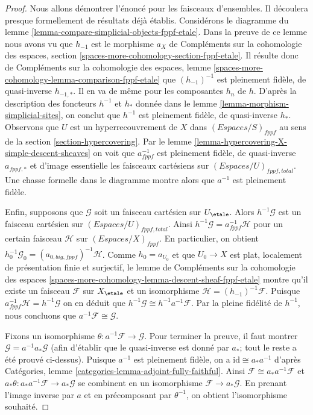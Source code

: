 \begin{proof}
Nous allons démontrer l'énoncé pour les faisceaux d'ensembles. Il découlera
presque formellement de résultats déjà établis.
Considérons le diagramme du lemme
\ref{lemma-compare-simplicial-objects-fppf-etale}.
Dans la preuve de ce lemme nous avons vu que
$h_{-1}$ est le morphisme $a_X$ de
Compléments sur la cohomologie des espaces, section
\ref{spaces-more-cohomology-section-fppf-etale}.
Il résulte donc de
Compléments sur la cohomologie des espaces, lemme
\ref{spaces-more-cohomology-lemma-comparison-fppf-etale}
que $(h_{-1})^{-1}$ est pleinement fidèle, de quasi-inverse $h_{-1, *}$.
Il en va de même pour les composantes $h_n$ de $h$.
D'après la description des foncteurs $h^{-1}$ et $h_*$ donnée dans le
lemme \ref{lemma-morphism-simplicial-sites},
on conclut que $h^{-1}$ est pleinement fidèle, de quasi-inverse $h_*$.
Observons que $U$ est un hyperrecouvrement de $X$ dans $(\textit{Espaces}/S)_{fppf}$
au sens de la section \ref{section-hypercovering}.
Par le lemme \ref{lemma-hypercovering-X-simple-descent-sheaves}
on voit que $a_{fppf}^{-1}$ est pleinement fidèle, de quasi-inverse
$a_{fppf, *}$ et d'image essentielle les faisceaux cartésiens
sur $(\textit{Espaces}/U)_{fppf, total}$.
Une chasse formelle dans le diagramme montre alors que
$a^{-1}$ est pleinement fidèle.

\medskip\noindent
Enfin, supposons que $\mathcal{G}$ soit un faisceau cartésien sur $U_\etale$.
Alors $h^{-1}\mathcal{G}$ est un faisceau cartésien sur
$(\textit{Espaces}/U)_{fppf, total}$. Ainsi
$h^{-1}\mathcal{G} = a_{fppf}^{-1}\mathcal{H}$ pour un certain faisceau
$\mathcal{H}$ sur $(\textit{Espaces}/X)_{fppf}$.
En particulier, on obtient
$h_0^{-1}\mathcal{G}_0 = (a_{0, big, fppf})^{-1}\mathcal{H}$.
Comme $h_0 = a_{U_0}$ et que $U_0 \to X$ est
plat, localement de présentation finie et surjectif, le
lemme de Compléments sur la cohomologie des espaces
\ref{spaces-more-cohomology-lemma-descent-sheaf-fppf-etale} montre
qu'il existe un faisceau $\mathcal{F}$ sur $X_\etale$ et un isomorphisme
$\mathcal{H} = (h_{-1})^{-1}\mathcal{F}$.
Puisque $a_{fppf}^{-1}\mathcal{H} = h^{-1}\mathcal{G}$
on en déduit que $h^{-1}\mathcal{G} \cong h^{-1}a^{-1}\mathcal{F}$.
Par la pleine fidélité de $h^{-1}$, nous concluons que
$a^{-1}\mathcal{F} \cong \mathcal{G}$.

\medskip\noindent
Fixons un isomorphisme $\theta : a^{-1}\mathcal{F} \to \mathcal{G}$.
Pour terminer la preuve, il faut montrer $\mathcal{G} = a^{-1}a_*\mathcal{G}$
(afin d'établir que le quasi-inverse est donné par $a_*$; tout le reste
a été prouvé ci-dessus).
Puisque $a^{-1}$ est pleinement fidèle, on a $\text{id} \cong a_*a^{-1}$ d'après
Catégories, lemme \ref{categories-lemma-adjoint-fully-faithful}.
Ainsi $\mathcal{F} \cong a_*a^{-1}\mathcal{F}$ et
$a_*\theta : a_*a^{-1}\mathcal{F} \to a_*\mathcal{G}$
se combinent en un isomorphisme $\mathcal{F} \to a_*\mathcal{G}$.
En prenant l'image inverse par $a$ et en précomposant par $\theta^{-1}$,
on obtient l'isomorphisme souhaité.
\end{proof}

